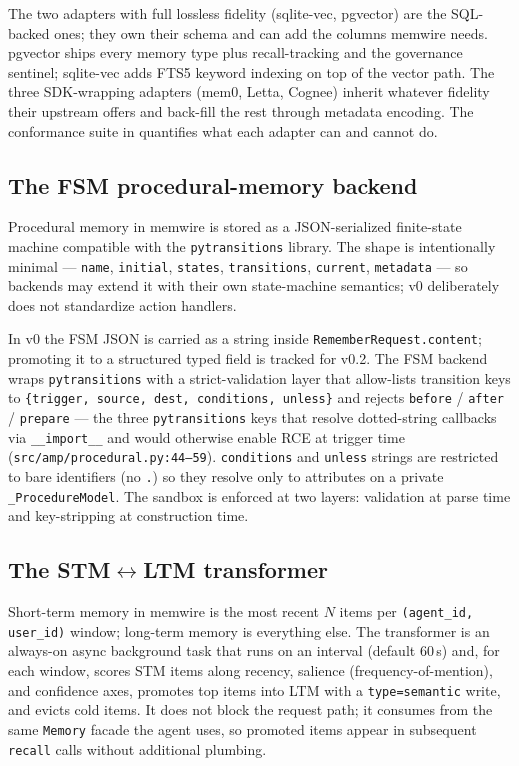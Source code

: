 \documentclass[11pt,letterpaper,twocolumn]{article}
\begin{document}
The two adapters with full lossless fidelity (sqlite-vec, pgvector) are the SQL-backed ones; they own their schema and can add the columns memwire needs. pgvector ships every memory type plus recall-tracking and the governance sentinel; sqlite-vec adds FTS5 keyword indexing on top of the vector path. The three SDK-wrapping adapters (mem0, Letta, Cognee) inherit whatever fidelity their upstream offers and back-fill the rest through metadata encoding. The conformance suite in  quantifies what each adapter can and cannot do.

\subsection{The FSM procedural-memory backend}
\label{sec:impl-fsm}

Procedural memory in memwire is stored as a JSON-serialized finite-state machine compatible with the \texttt{pytransitions} library. The shape is intentionally minimal --- \texttt{name}, \texttt{initial}, \texttt{states}, \texttt{transitions}, \texttt{current}, \texttt{metadata} --- so backends may extend it with their own state-machine semantics; v0 deliberately does not standardize action handlers.

In v0 the FSM JSON is carried as a string inside \texttt{RememberRequest.content}; promoting it to a structured typed field is tracked for v0.2. The FSM backend wraps \texttt{pytransitions} with a strict-validation layer that allow-lists transition keys to \texttt{\{trigger, source, dest, conditions, unless\}} and rejects \texttt{before} / \texttt{after} / \texttt{prepare} --- the three \texttt{pytransitions} keys that resolve dotted-string callbacks via \texttt{\_\_import\_\_} and would otherwise enable RCE at trigger time (\texttt{src/amp/procedural.py:44--59}). \texttt{conditions} and \texttt{unless} strings are restricted to bare identifiers (no \texttt{.}) so they resolve only to attributes on a private \texttt{\_ProcedureModel}. The sandbox is enforced at two layers: validation at parse time and key-stripping at construction time.

\subsection{The STM$\leftrightarrow$LTM transformer}
\label{sec:impl-stm-ltm}

Short-term memory in memwire is the most recent $N$ items per \texttt{(agent\_id, user\_id)} window; long-term memory is everything else. The transformer is an always-on async background task that runs on an interval (default 60\,s) and, for each window, scores STM items along recency, salience (frequency-of-mention), and confidence axes, promotes top items into LTM with a \texttt{type=semantic} write, and evicts cold items. It does not block the request path; it consumes from the same \texttt{Memory} facade the agent uses, so promoted items appear in subsequent \texttt{recall} calls without additional plumbing.
\end{document}
